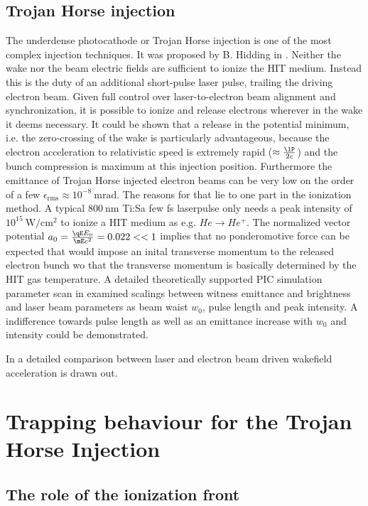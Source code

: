 \subsection{Trojan Horse injection}
\label{sec:Theory_TrojanHorse}
The underdense photocathode or Trojan Horse injection is one of the most complex injection techniques. It was proposed by B. Hidding in \cite{Hidding_PRL_2012}. Neither the wake nor the beam electric fields are sufficient to ionize the HIT medium. Instead this is the duty of an additional short-pulse laser pulse, trailing the driving electron beam. Given full control over laser-to-electron beam alignment and synchronization, it is possible to ionize and release electrons wherever in the wake it deems necessary. It could be shown that a release in the potential minimum, i.e. the zero-crossing of the wake is particularly advantageous, because the electron acceleration to relativistic speed is extremely rapid ($\approx \frac{\lP}{2c}$) and the bunch compression is maximum at this injection position. Furthermore the emittance of Trojan Horse injected electron beams can be very low on the order of a few $\epsilon_\mathrm{rms}\approx 10^{-8}\ \mathrm{m rad}$. The reasons for that lie to one part in the ionization method. A typical $800\ \mathrm{nm}$ Ti:Sa few fs laserpulse only needs a peak intensity of $10^{15}\ \mathrm{W/cm^2}$ to ionize a HIT medium as e.g. $He \rightarrow He^+$. The normalized vector potential $a_0 = \frac{\qE E_0}{\mE c^2} = 0.022<<1$ implies that no ponderomotive force can be expected that would impose an inital transverse momentum to the released electron bunch wo that the transverse momentum is basically determined by the HIT gas temperature. 
A detailed theoretically supported PIC simulation parameter scan in \cite{xi2013hybrid} examined scalings between witness emittance and brightness and laser beam parameters as beam waist $w_0$, pulse length and peak intensity. A indifference towards pulse length as well as an emittance increase with $w_0$ and intensity could be demonstrated.

In \cite{hidding2014ultrahigh} a detailed comparison between laser and electron beam driven wakefield acceleration is drawn out.
 
\section{Trapping behaviour for the Trojan Horse Injection}


\subsection{The role of the ionization front}

